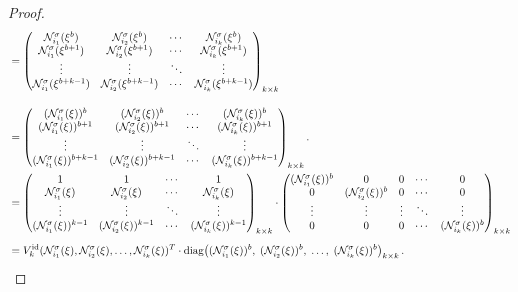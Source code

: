 \documentclass[11pt]{article}
\begin{document}
\begin{proof}
	\begin{align*}
		\notag&= \begin{pmatrix} 
			\mathcal{N}^\sigma_{i_1}(\xi^{b}) & \mathcal{N}^\sigma_{i_2}(\xi^{b}) & \cdots & \mathcal{N}^\sigma_{i_k}(\xi^{b}) \\ 
			\mathcal{N}^\sigma_{i_1}(\xi^{b+1}) & \mathcal{N}^\sigma_{i_2}(\xi^{b+1}) & \cdots & \mathcal{N}^\sigma_{i_k}(\xi^{b+1}) \\ 
			\vdots & \vdots & \ddots & \vdots \\ 
			\mathcal{N}^\sigma_{i_1}(\xi^{b+k-1}) & \mathcal{N}^\sigma_{i_2}(\xi^{b+k-1}) & \cdots & \mathcal{N}^\sigma_{i_k}(\xi^{b+k-1}) 
		\end{pmatrix}_{k\times k}\\[1em]
		\notag&= \begin{pmatrix} 
			(\mathcal{N}^\sigma_{i_1}(\xi))^{b} & (\mathcal{N}^\sigma_{i_2}(\xi))^{b} & \cdots & (\mathcal{N}^\sigma_{i_k}(\xi))^{b} \\ 
			(\mathcal{N}^\sigma_{i_1}(\xi))^{b+1} & (\mathcal{N}^\sigma_{i_2}(\xi))^{b+1} & \cdots & (\mathcal{N}^\sigma_{i_k}(\xi))^{b+1} \\ 
			\vdots & \vdots & \ddots & \vdots \\ 
			(\mathcal{N}^\sigma_{i_1}(\xi))^{b+k-1} & (\mathcal{N}^\sigma_{i_2}(\xi))^{b+k-1} & \cdots & (\mathcal{N}^\sigma_{i_k}(\xi))^{b+k-1}  
		\end{pmatrix}_{k\times k}.\\
		\notag&= \begin{pmatrix} 
			1 & 1 & \cdots & 1 \\ 
			\mathcal{N}^\sigma_{i_1}(\xi) & \mathcal{N}^\sigma_{i_2}(\xi) & \cdots & \mathcal{N}^\sigma_{i_k}(\xi) \\ 
			\vdots & \vdots & \ddots & \vdots \\ 
			(\mathcal{N}^\sigma_{i_1}(\xi))^{k-1} & (\mathcal{N}^\sigma_{i_2}(\xi))^{k-1} & \cdots & (\mathcal{N}^\sigma_{i_k}(\xi))^{k-1} 
		\end{pmatrix}_{k\times k} 
		\cdot  \begin{pmatrix}
		    (\mathcal{N}^\sigma_{i_1}(\xi))^b&0&0&\cdots&0\\
            0&(\mathcal{N}^\sigma_{i_2}(\xi))^b&0&\cdots&0\\
            \vdots&\vdots&\vdots&\ddots&\vdots\\
            0&0&0&\cdots&(\mathcal{N}^\sigma_{i_k}(\xi))^b
		\end{pmatrix}_{k\times k} \\[0.5em]
		\notag&= V^{\mathrm{id}}_k(\mathcal{N}^\sigma_{i_1}(\xi),\mathcal{N}^\sigma_{i_2}(\xi),\dots,\mathcal{N}^\sigma_{i_k}(\xi))^T
		\cdot\mathrm{diag}\!\left( (\mathcal{N}^\sigma_{i_1}(\xi))^b,\; (\mathcal{N}^\sigma_{i_2}(\xi))^b,\; \dots,\; (\mathcal{N}^\sigma_{i_k}(\xi))^b \right)_{k\times k}.\\
        \end{align*}
        

\end{proof}
\end{document}

